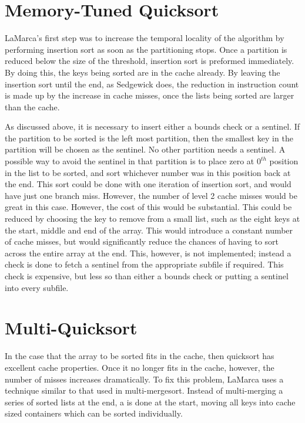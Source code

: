 \section{Memory-Tuned Quicksort}
LaMarca's first step was to increase the temporal locality of the algorithm by
performing insertion sort as soon as the partitioning stops. Once a partition is
reduced below the size of the threshold, insertion sort is preformed
immediately. By doing this, the keys being sorted are in the cache already. By
leaving the insertion sort until the end, as Sedgewick does, the reduction in
instruction count is made up by the increase in cache misses, once the
lists being sorted are larger than the cache. 

As discussed above, it is necessary to insert either a bounds check or a
sentinel.  If the partition to be sorted is the left most partition, then the
smallest key in the partition will be chosen as the sentinel. No other
partition needs a sentinel. A possible way to avoid the sentinel in that
partition is to place zero at $0^{th}$ position in the list to be sorted, and
sort whichever number was in this position back at the end. This sort could be
done with one iteration of insertion sort, and would have just one branch miss.
However, the number of level 2 cache misses would be great in this case.
However, the cost of this would be substantial.  This could be reduced by
choosing the key to remove from a small list, such as the eight keys at the
start, middle and end of the array. This would introduce a constant number of
cache misses, but would significantly reduce the chances of having to sort
across the entire array at the end. This, however, is not implemented; instead a
check is done to fetch a sentinel from the appropriate subfile if required. This
check is expensive, but less so than either a bounds check or putting a sentinel
into every subfile.

\section{Multi-Quicksort}

In the case that the array to be sorted fits in the cache, then quicksort has
excellent cache properties. Once it no longer fits in the cache, however, the
number of misses increases dramatically. To fix this problem, LaMarca uses a
technique similar to that used in multi-mergesort. Instead of multi-merging a
series of sorted lists at the end, a  is done at the start,
moving all keys into cache sized containers which can be sorted individually.

